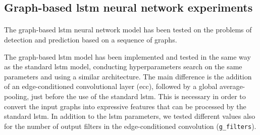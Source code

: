 \subsection{Graph-based \acs{lstm} neural network experiments}
\paragraph{} The graph-based \acs{lstm} neural network model has been tested on the problems of detection and prediction based on a sequence of graphs.

The graph-based \acs{lstm} model has been implemented and tested in the same way as the standard \acs{lstm} model, conducting hyperparameters search on the same parameters and using a similar architecture. The main difference is the addition of an edge-conditioned convolutional layer (\acs{ecc}), followed by a global average-pooling, just before the use of the standard \acs{lstm}. This is necessary in order to convert the input graphs into expressive features that can be processed by the standard \acs{lstm}. In addition to the \acs{lstm} parameters, we tested different values also for the number of output filters in the edge-conditioned convolution (\texttt{g\_filters}).

